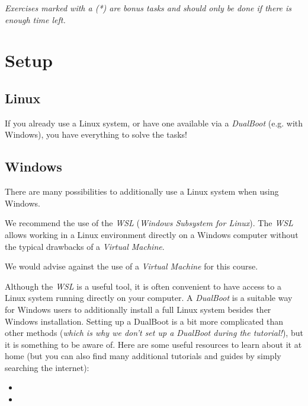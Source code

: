 \documentclass[english]{sheet}
\subtitle{Linux Exercise}
\begin{document}
\maketitle

\textit{Exercises marked with a (*) are bonus tasks and should only be done if there is enough time left.}

\section{Setup}

\subsection{Linux}

If you already use a Linux system, or have one available via a \emph{DualBoot} (e.g. with Windows), you have everything to solve the tasks!

\subsection{Windows}

There are many possibilities to additionally use a Linux system when using Windows.

We recommend the use of the \emph{WSL} (\emph{Windows Subsystem for Linux}). The \emph{WSL} allows working in a Linux environment directly on a Windows computer without the typical drawbacks of a \emph{Virtual Machine}.

We would advise against the use of a \emph{Virtual Machine} for this course.

Although the \emph{WSL} is a useful tool, it is often convenient to have access to a Linux system running directly on your computer. A \emph{DualBoot} is a suitable way for Windows users to additionally install a full Linux system besides ther Windows installation. Setting up a DualBoot is a bit more complicated than other methods (\emph{which is why we don't set up a DualBoot during the tutorial!}), but it is something to be aware of. Here are some useful resources to learn about it at home (but you can also find many additional tutorials and guides by simply searching the internet):

\begin{itemize}
    \item {}
    \item {}
\end{itemize}
\end{document}
